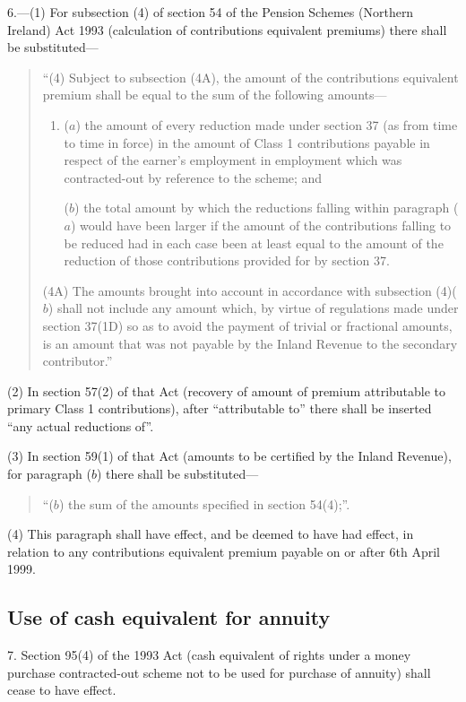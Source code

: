 \documentclass[12pt,a4paper]{article}
\begin{document}
6.---(1) For subsection (4)  of section 54 of the Pension Schemes (Northern Ireland) Act 1993 (calculation of contributions equivalent premiums) there shall be substituted—
\begin{quotation}
“(4) Subject to subsection (4A), the amount of the contributions equivalent premium shall be equal to the sum of the following amounts—
\begin{enumerate}\item[]
($a$) the amount of every reduction made under section 37 (as from time to time in force) in the amount of Class 1 contributions payable in respect of the earner’s employment in employment which was contracted-out by reference to the scheme; and

($b$) the total amount by which the reductions falling within paragraph ($a$)  would have been larger if the amount of the contributions falling to be reduced had in each case been at least equal to the amount of the reduction of those contributions provided for by section 37. 
\end{enumerate}

(4A) The amounts brought into account in accordance with subsection (4)($b$)  shall not include any amount which, by virtue of regulations made under section 37(1D) so as to avoid the payment of trivial or fractional amounts, is an amount that was not payable by the Inland Revenue to the secondary contributor.”
\end{quotation}

(2) In section 57(2)  of that Act (recovery of amount of premium attributable to primary Class 1 contributions), after “attributable to” there shall be inserted “any actual reductions of”.

(3) In section 59(1)  of that Act (amounts to be certified by the Inland Revenue), for paragraph ($b$)  there shall be substituted—
\begin{quotation}
“($b$) the sum of the amounts specified in section 54(4);”.
\end{quotation}

(4) This paragraph shall have effect, and be deemed to have had effect, in relation to any contributions equivalent premium payable on or after 6th April 1999. 

\subsection*{Use of cash equivalent for annuity}

7. Section 95(4)  of the 1993 Act (cash equivalent of rights under a money purchase contracted-out scheme not to be used for purchase of annuity) shall cease to have effect.
\end{document}
